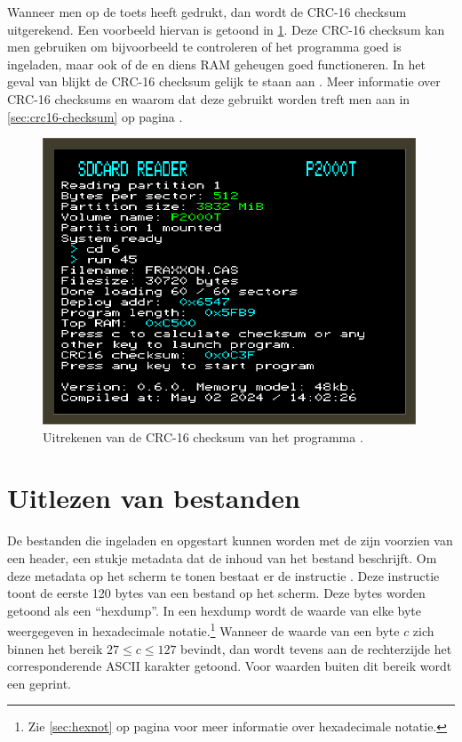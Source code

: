
Wanneer men op de  toets heeft gedrukt, dan wordt de CRC-16 checksum uitgerekend. Een voorbeeld hiervan is getoond in \cref{fig:screenshot-run-fraxon-checksum}. Deze CRC-16 checksum kan men gebruiken om bijvoorbeeld te controleren of het programma goed is ingeladen, maar ook of de \product en diens RAM geheugen goed functioneren. In het geval van  blijkt de CRC-16 checksum gelijk te staan aan . Meer informatie over CRC-16 checksums en waarom dat deze gebruikt worden treft men aan in \cref{sec:crc16-checksum} op pagina \pageref{sec:crc16-checksum}.

\begin{figure}[h!]
    \centering
    \includegraphics[width=0.99\textwidth]{img/run-fraxxon-checksum.png}
    \caption{Uitrekenen van de CRC-16 checksum van het programma .}
    \label{fig:screenshot-run-fraxon-checksum}
\end{figure}

%
%
%
\section{Uitlezen van bestanden}
\label{sec:hexdump}

De bestanden die ingeladen en opgestart kunnen worden met de \product zijn voorzien van een header, een stukje metadata dat de inhoud van het bestand beschrijft. Om deze metadata op het scherm te tonen bestaat er de instructie . Deze instructie toont de eerste 120 bytes van een bestand op het scherm. Deze bytes worden getoond als een ``hexdump''. In een hexdump wordt de waarde van elke byte weergegeven in hexadecimale notatie.\footnote{Zie \cref{sec:hexnot} op pagina \pageref{sec:hexnot} voor meer informatie over hexadecimale notatie.} Wanneer de waarde van een byte $c$ zich binnen het bereik $27 \leq c \leq 127$ bevindt, dan wordt tevens aan de rechterzijde het corresponderende ASCII karakter getoond. Voor waarden buiten dit bereik wordt een  geprint.

